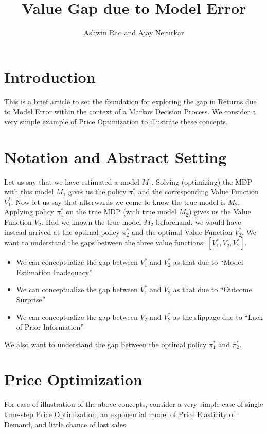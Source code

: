 \documentclass[12pt]{amsart}
\title{Value Gap due to Model Error}
\author{Ashwin Rao and Ajay Nerurkar}
\date{} %
\begin{document}
   
   \maketitle 
   \section{Introduction}
   This is a brief article to set the foundation for exploring the gap in Returns due to Model Error within the context of a Markov Decision Process. We consider a very simple example of Price Optimization to illustrate these concepts.
   
   \section{Notation and Abstract Setting}
   Let us say that we have estimated a model $M_1$. Solving (optimizing) the MDP with this model $M_1$ gives us the policy $\pi_1^*$ and the corresponding Value Function $V_1^*$. Now let us say that afterwards we come to know the true model is $M_2$. Applying policy $\pi_1^*$ on the true MDP (with true model $M_2$) gives us the Value Function $V_2$. Had we known the true model $M_2$ beforehand, we would have instead arrived at the optimal policy $\pi_2^*$ and the optimal Value Function $V_2^*$. We want to understand the gaps between the three value functions: $[V_1^*, V_2, V_2^*]$.
   
   \begin{itemize}
   \item We can conceptualize the gap between $V_1^*$ and $V_2^*$ as that due to ``Model Estimation Inadequacy''
   \item We can conceptualize the gap between $V_1^*$ and $V_2$ as that due to ``Outcome Surprise''
   \item We can conceptualize the gap between $V_2$ and $V_2^*$ as the slippage due to ``Lack of Prior Information''
   \end{itemize}
   
   We also want to understand the gap between the optimal policy $\pi_1^*$ and $\pi_2^*$.
       
    \section{Price Optimization}
    For ease of illustration of the above concepts, consider a very simple case of single time-step Price Optimization, an exponential model of Price Elasticity of Demand, and little chance of lost sales.
\end{document}
